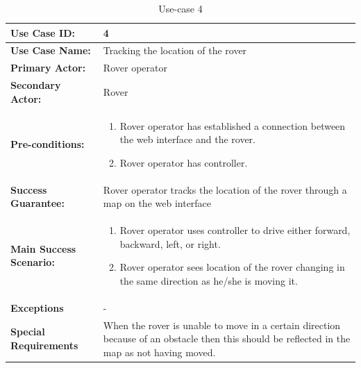 \documentclass[12pt]{article}
\begin{document}
	 	\begin{table}[H]
	 		\centering
	 		\begin{tabularx}{\linewidth}{|X|X|}
	 			\hline
	 			\textbf{Use Case ID:} &4\\
	 			\hline
	 			\textbf{Use Case Name:} &Tracking the location of the rover\\
	 			\hline
	 			\textbf{Primary Actor:} &Rover operator\\
	 			\hline
	 			\textbf{Secondary Actor:} &Rover\\
	 			\hline
	 			\textbf{Pre-conditions:} &\begin{enumerate}
	 				\item Rover operator has established a connection between the web interface and the rover.
	 				\item Rover operator has controller.
	 			\end{enumerate}\\
	 			\hline
	 			\textbf{Success Guarantee:} &
	 			Rover operator tracks the location of the rover through a map on the web interface \\
	 			\hline 
	 			\textbf{Main Success Scenario:} &\begin{enumerate}
	 				\item Rover operator uses controller to drive either forward, backward, left, or right.
	 				\item Rover operator sees location of the rover changing in the same direction as he/she is moving it.
	 			\end{enumerate}\\
	 			\hline
	 			\textbf{Exceptions} &-\\
	 			\hline
	 			\textbf{Special Requirements} &When the rover is unable to move in a certain direction because of an obstacle then this should be reflected in the map as not having moved. \\
	 			\hline
	 		\end{tabularx}
	 		\caption{Use-case 4}
	 		\label{table:Use-case4}   
	 	\end{table}
\end{document}
